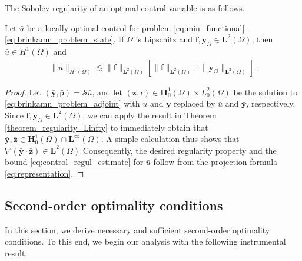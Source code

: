 \documentclass[final]{siamart0216}
\begin{document}
The Sobolev regularity of an optimal control variable is as follows.

\begin{theorem}
\label{thm:regularity_optimal_control}
Let $\bar{u}$ be a locally optimal control for problem \eqref{eq:min_functional}--\eqref{eq:brinkamn_problem_state}. If $\Omega$ is Lipschitz and $\mathbf{f},\mathbf{y}_{\Omega}\in\mathbf{L}^2(\Omega)$, then $\bar{u}\in H^1(\Omega)$ and
\begin{align}\label{eq:control_regul_estimate}
\|\bar{u}\|_{H^1(\Omega)}
\lesssim
\|\mathbf{f}\|_{\mathbf{L}^2(\Omega)}
\left[
\|\mathbf{f}\|_{\mathbf{L}^2(\Omega)}+\|\mathbf{y}_{\Omega}\|_{\mathbf{L}^2(\Omega)}
\right].
\end{align}
\end{theorem} 
\begin{proof}
Let $(\bar{\mathbf{y}},\bar{\mathsf{p}})=\mathcal{S}\bar{u}$, and let $(\mathbf{z},\mathsf{r})\in\mathbf{H}_0^1(\Omega)\times L_0^2(\Omega)$ be the solution to  \eqref{eq:brinkamn_problem_adjoint} with $u$ and $\mathbf{y}$ replaced by $\bar{u}$ and $\bar{\mathbf{y}}$, respectively. Since $\mathbf{f},\mathbf{y}_{\Omega}\in\mathbf{L}^2(\Omega)$, we can apply the result in Theorem \ref{theorem_regularity_Linfty} to immediately obtain that $\bar{\mathbf{y}},\bar{\mathbf{z}}\in\mathbf{H}_0^1(\Omega)\cap\mathbf{L}^{\infty}(\Omega)$. A simple calculation thus shows that $\nabla (\bar{\mathbf{y}}\cdot\bar{\mathbf{z}}) \in \mathbf{L}^2(\Omega)$ Consequently, the desired regularity property and the bound \eqref{eq:control_regul_estimate} for $\bar{u}$ follow from the projection formula \eqref{eq:representation}.
\end{proof}

\subsection{Second-order optimality conditions}\label{section:secondconditions}
In this section, we derive necessary and sufficient second-order optimality conditions. To this end, we begin our analysis with the following instrumental result.
\end{document}
